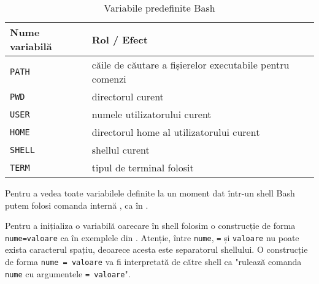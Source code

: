 \begin{table}[!htb]
  \caption{Variabile predefinite Bash}
  \begin{center}
    \begin{tabular}{ p{} p{} }
      \toprule
        \textbf{Nume variabilă} &
        \textbf{Rol / Efect} \\
      \midrule
        \texttt{PATH} &
        căile de căutare a fișierelor executabile pentru comenzi \\

        \texttt{PWD} &
        directorul curent \\

        \texttt{USER} &
        numele utilizatorului curent \\

        \texttt{HOME} &
        directorul home al utilizatorului curent \\

        \texttt{SHELL} &
        shellul curent \\

        \texttt{TERM} &
        tipul de terminal folosit \\
      \bottomrule
    \end{tabular}
    \label{tab:cli:shell-vars}
  \end{center}
\end{table}

Pentru a vedea toate variabilele definite la un moment dat într-un shell Bash
putem folosi comanda internă , ca în .


Pentru a inițializa o variabilă oarecare în shell folosim o construcție de forma
\texttt{nume=valoare} ca în exemplele din .
Atenție, între \texttt{nume}, \texttt{=} și \texttt{valoare} nu poate exista caracterul spațiu, deoarece acesta este separatorul shellului.
O construcție de forma \texttt{nume = valoare} va fi interpretată de către shell ca "rulează comanda \texttt{nume} cu argumentele \texttt{= valoare}".

